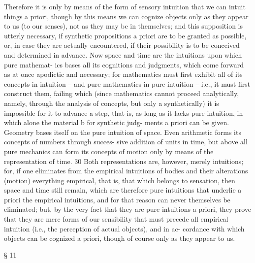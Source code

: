 Therefore it is only by means of the form of sensory intuition that we
can intuit things a priori, though by this means we can cognize objects
only as they appear to us (to our senses), not as they may be in themselves;
and this supposition is utterly necessary, if synthetic propositions a priori
are to be granted as possible, or, in case they are actually encountered,
if their possibility is to be conceived and determined in advance.
Now space and time are the intuitions upon which pure mathemat-
ics bases all its cognitions and judgments, which come forward as at
once apodictic and necessary; for mathematics must ﬁrst exhibit all of
its concepts in intuition – and pure mathematics in pure intuition – i.e.,
it must ﬁrst construct them, failing which (since mathematics cannot
proceed analytically, namely, through the analysis of concepts, but only a
synthetically) it is impossible for it to advance a step, that is, as long as
it lacks pure intuition, in which alone the material b for synthetic judg-
ments a priori can be given. Geometry bases itself on the pure intuition
of space. Even arithmetic forms its concepts of numbers through succes-
sive addition of units in time, but above all pure mechanics can form its
concepts of motion only by means of the representation of time. 30 Both
representations are, however, merely intuitions; for, if one eliminates
from the empirical intuitions of bodies and their alterations (motion)
everything empirical, that is, that which belongs to sensation, then space
and time still remain, which are therefore pure intuitions that underlie
a priori the empirical intuitions, and for that reason can never themselves
be eliminated; but, by the very fact that they are pure intuitions a priori,
they prove that they are mere forms of our sensibility that must precede
all empirical intuition (i.e., the perception of actual objects), and in ac-
cordance with which objects can be cognized a priori, though of course
only as they appear to us.

§ 11


